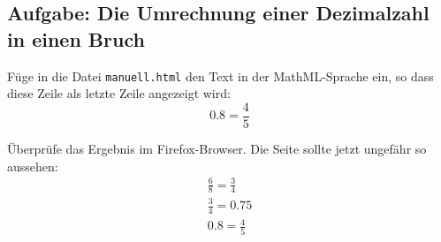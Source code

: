 \subsection*{Aufgabe: Die Umrechnung einer Dezimalzahl in einen Bruch}

Füge in die Datei \texttt{manuell.html} den Text in der MathML-Sprache ein, so dass diese Zeile als letzte Zeile angezeigt wird:
\[
0.8 = \frac{4}{5}
\]

Überprüfe das Ergebnis im Firefox-Browser. Die Seite sollte jetzt ungefähr so aussehen:
\begin{align*}
& \frac{6}{8} = \frac{3}{4} & \\[2ex]
& \frac{3}{4} = 0.75 & \\[2ex]
& 0.8 = \frac{4}{5} & 
\end{align*}




